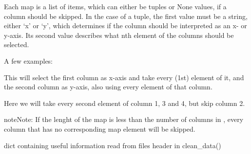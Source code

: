 \documentclass[letterpaper,10pt,english]{sphinxmanual}
\begin{document}
\begin{fulllineitems}
\begin{fulllineitems}
Each map is a list of items, which can either be tuples or None
values, if a column should be skipped. In the case of a tuple, the
first value must be a string, either ‘x’ or ‘y’, which determines
if the column should be interpreted as an x- or y-axis. Its second
value describes what nth element of the columns should be selected.

A few examples:

\begin{sphinxVerbatim}[commandchars=\\\{\}]
  \PYG{p}{[}\PYG{p}{]}
\end{sphinxVerbatim}

This will select the first column as x-axis and take every (1st)
element of it, and the second column as y-axis, also using every
element of that column.

\begin{sphinxVerbatim}[commandchars=\\\{\}]
  \PYG{p}{[}\PYG{p}{]}
\end{sphinxVerbatim}

Here we will take every second element of column 1, 3 and 4, but
skip column 2.

\begin{sphinxadmonition}{note}{Note:}
If the lenght of the map is less than the number of columns in , every column that has no corresponding map element will be skipped.
\end{sphinxadmonition}

\end{fulllineitems}


\begin{fulllineitems}
\label{\detokenize{measurement:measurement.Measurement.settings}}
dict containing useful information read from files header in clean\_data()


\end{fulllineitems}
\end{fulllineitems}
\end{document}
